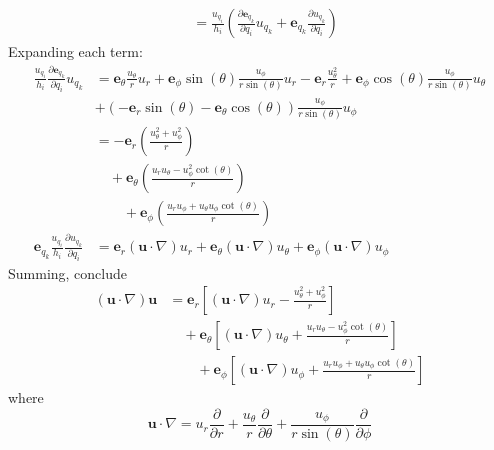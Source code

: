 \documentclass[a4paper]{article}
\begin{document}
\begin{enumerate}[label=(\alph*)]
\begin{align*}
		 & = \frac{u_{q_{i}}}{h_{i}}\!\left( \frac{\partial \pmb{e}_{q_{k}}}{\partial q_{i}}u_{q_{k}} + \pmb{e}_{q_{k}}\frac{\partial u_{q_{k}}}{\partial q_{i}} \right)
	\end{align*}
	Expanding each term:
	\begin{align*}
		\frac{u_{q_{i}}}{h_{i}}\frac{\partial \pmb{e}_{q_{k}}}{\partial q_{i}}u_{q_{k}} & = \pmb{e}_{\theta}\frac{u_{\theta}}{r}u_{r} + \pmb{e}_{\phi}\sin\!\left(\theta\right)\frac{u_{\phi}}{r \sin\!\left(\theta\right)}u_{r} - \pmb{e}_{r}\frac{u^{2}_{\theta}}{r} + \pmb{e}_{\phi}\cos\!\left(\theta\right)\frac{u_{\phi}}{r \sin\!\left(\theta\right)}u_{\theta} \\ 
												& + \!\left( -\pmb{e}_{r}\sin\!\left(\theta\right) - \pmb{e}_{\theta}\cos\!\left(\theta\right) \right)\frac{u_{\phi}}{r \sin\!\left(\theta\right)}u_{\phi} \\
		 & = -\pmb{e}_{r}\!\left( \frac{u^{2}_{\theta} + u^{2}_{\phi}}{r} \right) \\
		 & \quad + \pmb{e}_{\theta}\!\left( \frac{u_{r}u_{\theta} - u^{2}_{\phi}\cot\!\left(\theta\right)}{r} \right) \\
		 & \qquad + \pmb{e}_{\phi}\!\left( \frac{u_{r}u_{\phi} + u_{\theta}u_{\phi}\cot\!\left(\theta\right)}{r} \right) \\ 
		\pmb{e}_{q_{k}}\frac{u_{q_{i}}}{h_{i}}\frac{\partial u_{q_{k}}}{\partial q_{i}} & = \pmb{e}_{r}\!\left( \pmb{u} \cdot \nabla \right)u_{r} + \pmb{e}_{\theta}\!\left( \pmb{u} \cdot \nabla \right)u_{\theta} + \pmb{e}_{\phi}\!\left( \pmb{u} \cdot \nabla \right)u_{\phi}
	\end{align*}
	Summing, conclude
	\begin{align*}
		\!\left( \pmb{u} \cdot \nabla \right)\pmb{u} & = \pmb{e}_{r}\!\left[ \!\left( \pmb{u} \cdot \nabla \right)u_{r} - \frac{u^{2}_{\theta} + u^{2}_{\phi}}{r} \right] \\
							     & \quad + \pmb{e}_{\theta}\!\left[ \!\left( \pmb{u} \cdot \nabla \right)u_{\theta} + \frac{u_{r}u_{\theta} - u^{2}_{\phi}\cot\!\left(\theta\right)}{r} \right] \\
							     & \qquad + \pmb{e}_{\phi}\!\left[ \!\left( \pmb{u} \cdot \nabla \right)u_{\phi} + \frac{u_{r}u_{\phi} + u_{\theta}u_{\phi}\cot\!\left(\theta\right)}{r} \right] 
	\end{align*}
	where 
	\[
		\pmb{u} \cdot \nabla = u_{r}\frac{\partial }{\partial r} + \frac{u_{\theta}}{r}\frac{\partial }{\partial \theta} + \frac{u_{\phi}}{r \sin\!\left(\theta\right)}\frac{\partial }{\partial \phi}
	\]
\end{enumerate}
\end{document}
